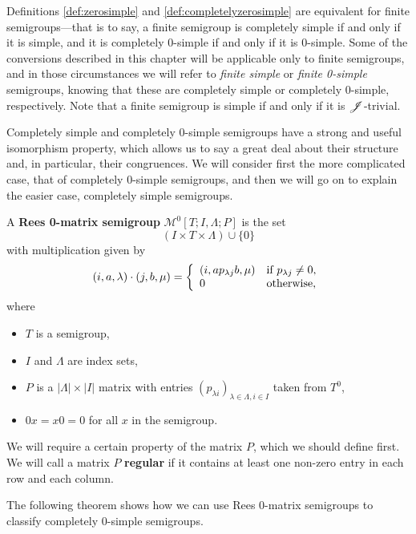 Definitions \ref{def:zerosimple} and \ref{def:completelyzerosimple} are
equivalent for finite semigroups---that is to say, a finite semigroup is
completely simple if and only if it is simple, and it is completely 0-simple if
and only if it is 0-simple.  Some of the conversions described in this chapter
will be applicable only to finite semigroups, and in those circumstances we will
refer to \textit{finite simple} or \textit{finite 0-simple} semigroups, knowing
that these are completely simple or completely 0-simple, respectively.
Note that a finite semigroup is simple if and only if it is $\mathrel{\mathscr{J}}$-trivial.

Completely simple and completely 0-simple semigroups have a strong and useful
isomorphism property, which allows us to say a great deal about their structure
and, in particular, their congruences.  We will consider first the more
complicated case, that of completely 0-simple semigroups, and then we will go on
to explain the easier case, completely simple semigroups.

\begin{definition}
  \label{def:rzms}
  A \textbf{Rees 0-matrix semigroup} $\mathcal{M}^0[T;I,\Lambda;P]$ is the set
  $$(I \times T \times \Lambda) \cup \{0\}$$
  with multiplication given by
  $$(i,a,\lambda) \cdot (j,b,\mu) = \left\{
    \begin{array}{l l}
      (i,ap_{\lambda j}b, \mu) & \text{if~} p_{\lambda j} \neq 0, \\
      0 & \text{otherwise,}
    \end{array}
  \right.$$
  where
  \begin{itemize}
  \item $T$ is a semigroup,
  \item $I$ and $\Lambda$ are index sets,
  \item $P$ is a $|\Lambda| \times |I|$ matrix with entries $(p_{\lambda
      i})_{\lambda \in \Lambda, i \in I}$
    taken from $T^0$,
  \item $0x=x0=0$ for all $x$ in the semigroup.
  \end{itemize}
  \cite[\S 3.2]{howie}
\end{definition}

We will require a certain property of the matrix $P$, which we should define
first.  We will call a matrix $P$ \textbf{regular} if it contains at least one
non-zero entry in each row and each column.

The following theorem shows how we can use Rees 0-matrix semigroups to classify
completely 0-simple semigroups.


